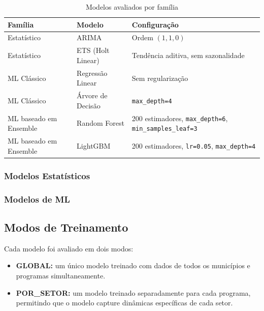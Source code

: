 \documentclass[12pt, a4paper]{article}
\begin{document}
\begin{table}[H]
  \centering
  \caption{Modelos avaliados por família}
  \label{tab:modelos}
  \begin{tabular}{lll}
    \toprule
    \textbf{Família}   & \textbf{Modelo}         & \textbf{Configuração} \\
    \midrule
    Estatístico        & ARIMA                   & Ordem $(1,1,0)$ \\
    Estatístico        & ETS (Holt Linear)       & Tendência aditiva, sem sazonalidade \\
    ML Clássico        & Regressão Linear        & Sem regularização \\
    ML Clássico        & Árvore de Decisão       & \texttt{max\_depth=4} \\
    ML baseado em Ensemble         & Random Forest           & 200 estimadores, \texttt{max\_depth=6}, \texttt{min\_samples\_leaf=3} \\
    ML baseado em Ensemble         & LightGBM                & 200 estimadores, \texttt{lr=0.05}, \texttt{max\_depth=4} \\
    \bottomrule
  \end{tabular}
\end{table}

\subsubsection{Modelos Estatísticos}


\subsubsection{Modelos de ML}

\subsection{Modos de Treinamento}

Cada modelo foi avaliado em dois modos:

\begin{itemize}[leftmargin=2cm]
  \item \textbf{GLOBAL:} um único modelo treinado com dados de todos os
        municípios e programas simultaneamente.
  \item \textbf{POR\_SETOR:} um modelo treinado separadamente para cada
        programa, permitindo que o modelo capture dinâmicas específicas
        de cada setor.
\end{itemize}
\end{document}
